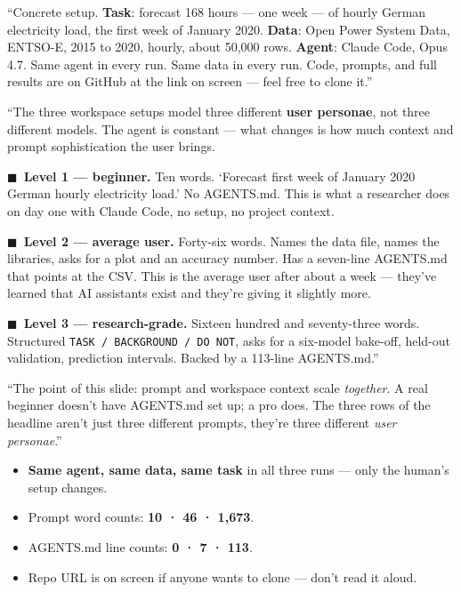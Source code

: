\documentclass[11pt,a4paper]{article}
\newenvironment{anchors}{%
  \begin{tcolorbox}[colback=jrcblue!6, colframe=jrcblue!50, boxrule=0.6pt, arc=2pt,
                    left=10pt, right=10pt, top=6pt, bottom=6pt, fontupper=\small,
                    title={\bfseries Anchor facts}, coltitle=jrcblue,
                    fonttitle=\small\bfseries, attach title to upper,
                    after title={\par\vspace{2pt}}]
}{%
  \end{tcolorbox}
}
\newenvironment{sayblock}{%
  \begin{tcolorbox}[colback=cardbg, colframe=jrcblue, boxrule=0.8pt, arc=2pt,
                    left=10pt, right=10pt, top=6pt, bottom=6pt, fontupper=\normalsize,
                    title={\bfseries Say this}, coltitle=white, colbacktitle=jrcblue,
                    fonttitle=\small\bfseries]
}{%
  \end{tcolorbox}
}
\newcommand{\levelpill}[2]{\textcolor{#1}{$\blacksquare$}~\textbf{\textcolor{#1}{#2}}}
\begin{document}
\begin{sayblock}
``Concrete setup. \textbf{Task}: forecast 168 hours — one week — of hourly
German electricity load, the first week of January 2020. \textbf{Data}: Open
Power System Data, ENTSO-E, 2015 to 2020, hourly, about 50,000 rows.
\textbf{Agent}: Claude Code, Opus 4.7. Same agent in every run. Same data in
every run. Code, prompts, and full results are on GitHub at the link on
screen — feel free to clone it.''\par\vspace{6pt}

``The three workspace setups model three different \textbf{user personae}, not
three different models. The agent is constant — what changes is how much
context and prompt sophistication the user brings.\par\vspace{4pt}

\levelpill{l1grey}{Level 1 — beginner.} Ten words. `Forecast first week of
January 2020 German hourly electricity load.' No AGENTS.md. This is what a
researcher does on day one with Claude Code, no setup, no project
context.\par\vspace{4pt}

\levelpill{l2amber}{Level 2 — average user.} Forty-six words. Names the data
file, names the libraries, asks for a plot and an accuracy number. Has a
seven-line AGENTS.md that points at the CSV. This is the average user after
about a week — they've learned that AI assistants exist and they're giving it
slightly more.\par\vspace{4pt}

\levelpill{l3orange}{Level 3 — research-grade.} Sixteen hundred and
seventy-three words. Structured \texttt{TASK / BACKGROUND / DO NOT}, asks for
a six-model bake-off, held-out validation, prediction intervals. Backed by a
113-line AGENTS.md.''\par\vspace{4pt}

``The point of this slide: prompt and workspace context scale \emph{together}.
A real beginner doesn't have AGENTS.md set up; a pro does. The three rows of
the headline aren't just three different prompts, they're three different
\emph{user personae}.''
\end{sayblock}

\begin{anchors}
\begin{itemize}
\item \textbf{Same agent, same data, same task} in all three runs — only the human's setup changes.
\item Prompt word counts: \textbf{10 · 46 · 1{,}673}.
\item AGENTS.md line counts: \textbf{0 · 7 · 113}.
\item Repo URL is on screen if anyone wants to clone — don't read it aloud.
\end{itemize}
\end{anchors}
\end{document}
